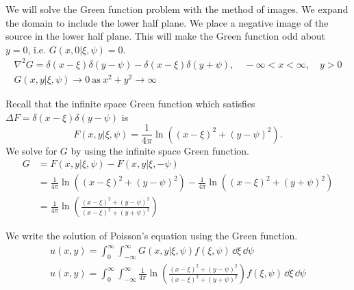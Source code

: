 We will solve the Green function problem with the method of images.  
We expand the domain to include the lower half plane.  We place a negative 
image of the source in the lower half plane.  This will make the Green 
function odd about $y = 0$, i.e. $G(x,0|\xi,\psi) = 0$.
\begin{gather*}
  \nabla^2 G = \delta(x-\xi)\delta(y-\psi) - \delta(x-\xi)\delta(y+\psi), \quad -\infty < x < \infty,\quad y > 0 
  \\
  G(x,y|\xi,\psi) \to 0\ \mathrm{as}\ x^2 + y^2 \to \infty
\end{gather*}

Recall that the infinite space Green function which satisfies
$\Delta F = \delta(x - \xi) \delta(y - \psi)$ is 
\[
F(x,y|\xi,\psi) = \frac{1}{4\pi} \ln\left( (x-\xi)^2 + (y-\psi)^2 \right).
\]
We solve for $G$ by using the infinite space Green function.
\begin{align*}
  G
  &= F(x,y|\xi,\psi) - F(x,y|\xi,-\psi)
  \\
  &= \frac{1}{4\pi} \ln \left( (x-\xi)^2 + (y-\psi)^2 \right)
  - \frac{1}{4\pi}\ln \left( (x-\xi)^2 + (y+\psi)^2 \right) 
  \\
  &= \frac{1}{4\pi} \ln \left( \frac{(x-\xi)^2 + (y-\psi)^2}{(x-\xi)^2 + (y+\psi)^2} \right)
\end{align*}

We write the solution of Poisson's equation using the Green function.
\begin{gather*}
  u(x,y) = \int_0^\infty \int_{-\infty}^\infty G(x,y|\xi,\psi) f(\xi,\psi) \,\dd \xi \,\dd \psi
  \\
  \boxed{
    u(x,y) = \int_0^\infty \int_{-\infty}^\infty \frac{1}{4\pi} \ln \left( \frac{(x-\xi)^2 + (y-\psi)^2}
      {(x-\xi)^2 + (y+\psi)^2} \right) f(\xi,\psi) \,\dd \xi \,\dd \psi
    }
\end{gather*}









